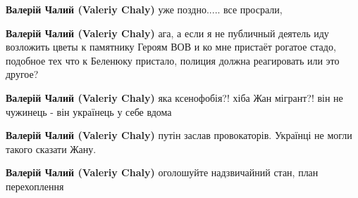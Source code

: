 \begin{itemize}
\begin{itemize}
 
\textbf{Валерій Чалий (Valeriy Chaly)} уже поздно..... все просрали,

 
\textbf{Валерій Чалий (Valeriy Chaly)} ага, а если я не публичный деятель иду возложить цветы к памятнику Героям ВОВ и ко мне пристаёт рогатое стадо, подобное тех что к Беленюку пристало, полиция должна реагировать или это другое?

 
\textbf{Валерій Чалий (Valeriy Chaly)} яка ксенофобія?! хіба Жан мігрант?! він не чужинець - він українець у себе вдома

 
\textbf{Валерій Чалий (Valeriy Chaly)} путін заслав провокаторів. Українці не могли такого сказати Жану.

 
\textbf{Валерій Чалий (Valeriy Chaly)} оголошуйте надзвичайний стан, план перехоплення

 

\end{itemize}
\end{itemize}
